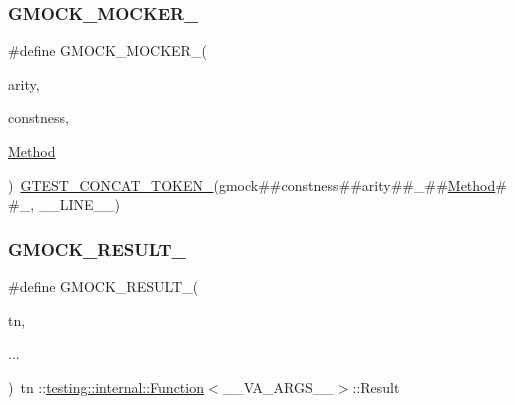 \mbox{\label{_obj__test_2lib_2googletest-release-1_88_81_2googlemock_2include_2gmock_2gmock-generated-function-mockers_8h_a7d362499e27b1bc3a9806dd3cf58a5b7}} 
\subsubsection{\texorpdfstring{GMOCK\_MOCKER\_}{GMOCK\_MOCKER\_}}
{\footnotesize\ttfamily \#define G\+M\+O\+C\+K\+\_\+\+M\+O\+C\+K\+E\+R\+\_\+(\begin{DoxyParamCaption}\item[{}]{arity,  }\item[{}]{constness,  }\item[{}]{\mbox{\hyperlink{_obj__test_2lib_2googletest-release-1_88_81_2googlemock_2test_2gmock-spec-builders__test_8cc_a95606368148f3e5aab5db46c32466afd}{Method}} }\end{DoxyParamCaption})~\mbox{\hyperlink{_obj__test_2lib_2googletest-release-1_88_81_2googletest_2include_2gtest_2internal_2gtest-internal_8h_ae3c336cbe1ae2bd1b1d019333e4428a0}{G\+T\+E\+S\+T\+\_\+\+C\+O\+N\+C\+A\+T\+\_\+\+T\+O\+K\+E\+N\+\_\+}}(gmock\#\#constness\#\#arity\#\#\+\_\+\#\#\mbox{\hyperlink{_obj__test_2lib_2googletest-release-1_88_81_2googlemock_2test_2gmock-spec-builders__test_8cc_a95606368148f3e5aab5db46c32466afd}{Method}}\#\#\+\_\+, \+\_\+\+\_\+\+L\+I\+N\+E\+\_\+\+\_\+)}

\mbox{\label{_obj__test_2lib_2googletest-release-1_88_81_2googlemock_2include_2gmock_2gmock-generated-function-mockers_8h_a0e9d94e9c77df84f1103af06feee1077}} 
\subsubsection{\texorpdfstring{GMOCK\_RESULT\_}{GMOCK\_RESULT\_}}
{\footnotesize\ttfamily \#define G\+M\+O\+C\+K\+\_\+\+R\+E\+S\+U\+L\+T\+\_\+(\begin{DoxyParamCaption}\item[{}]{tn,  }\item[{}]{... }\end{DoxyParamCaption})~tn \+::\mbox{\hyperlink{structtesting_1_1internal_1_1_function}{testing\+::internal\+::\+Function}}$<$\+\_\+\+\_\+\+V\+A\+\_\+\+A\+R\+G\+S\+\_\+\+\_\+$>$\+::Result}


